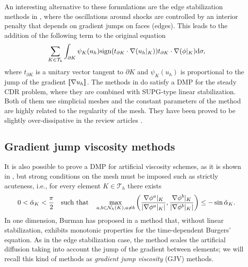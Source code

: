 An interesting alternative to these formulations are the edge stabilization methods in \cite{burman_stabilized_2005,burman_edge_2004}, where the oscillations around shocks are controlled by an interior penalty that depends on gradient jumps on faces (edges). This leads to the addition of the following term to the original equation
\begin{align*}%
\sum\limits_{K\in \mathcal{T}_h} \int_{\partial K} \psi_K(u_h) {\rm sign}(t_{\partial K}\cdot \nabla (u_h|_K))t_{\partial K}\cdot \nabla (\phi|_K) {\rm d} \sigma,
\end{align*}
where $t_{\partial K}$ is a unitary vector tangent to $\partial K$ and  $\psi_K(u_h)$ is proportional to the jump of the gradient $\lbrack\!\lbrack \nabla u_h \rbrack\!\rbrack$. The methods in \cite{burman_stabilized_2005,burman_edge_2004} do satisfy a DMP for the steady CDR problem, where they are combined with SUPG-type linear stabilization. Both of them use simplicial meshes and the constant parameters of the method are highly related to the regularity of the mesh. They have been proved to be slightly over-dissipative in the review articles \cite{john_spurious_2007,john_spurious_2008}. %



\subsection{Gradient jump viscosity methods}\label{s-gjv}
It is also possible to prove a DMP for artificial viscosity schemes, as it is shown in \cite{burman_nonlinear_2002}, but strong conditions on the mesh must be imposed such as strictly acuteness, i.e., for every element $K\in \mathcal{T}_h$ there exists 
\begin{align}\label{eq-condalpha}
0 < \tilde \alpha_K < \frac{\pi}{2} \quad \hbox{such  that} \quad \max\limits_{a, b \in \mathcal{N}_h(K), a \neq b} \left(\frac{\nabla\phi^a|_K}{|\nabla\phi^a|_K|},\frac{\nabla\phi^b|_K}{|\nabla\phi^b|_K|} \right) \leq - \sin \tilde \alpha_K.
\end{align}
In one dimension, Burman has proposed in \cite{burman_nonlinear_2007} a method that, without linear stabilization, exhibits monotonic properties for the time-dependent Burgers' equation. As in the edge stabilization case, the method scales the artificial diffusion taking into account the jump of the gradient between elements; we will recall this kind of methods as \emph{gradient jump viscosity} (GJV) methods. 

